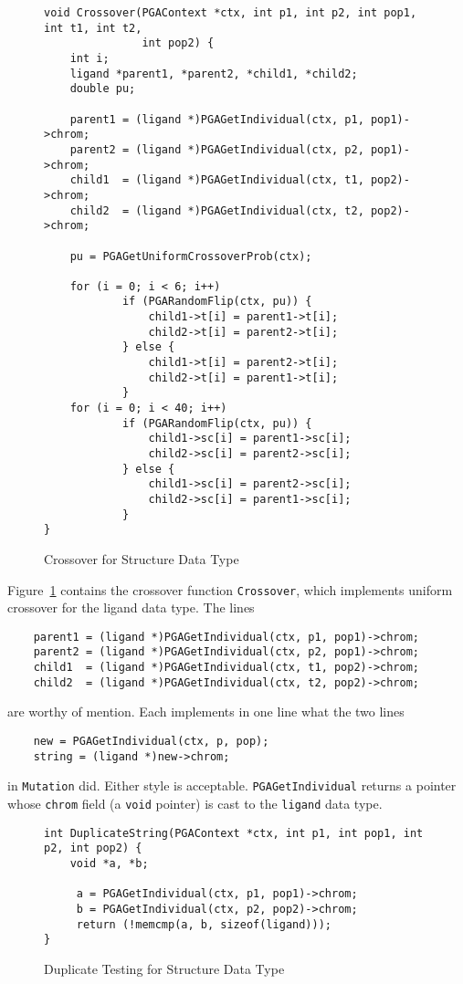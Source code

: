 \documentclass{report}
\begin{document}
\begin{figure}
\begin{verbatim}
void Crossover(PGAContext *ctx, int p1, int p2, int pop1, int t1, int t2,
               int pop2) {
    int i;
    ligand *parent1, *parent2, *child1, *child2;
    double pu;

    parent1 = (ligand *)PGAGetIndividual(ctx, p1, pop1)->chrom;
    parent2 = (ligand *)PGAGetIndividual(ctx, p2, pop1)->chrom;
    child1  = (ligand *)PGAGetIndividual(ctx, t1, pop2)->chrom;
    child2  = (ligand *)PGAGetIndividual(ctx, t2, pop2)->chrom;

    pu = PGAGetUniformCrossoverProb(ctx);

    for (i = 0; i < 6; i++)
            if (PGARandomFlip(ctx, pu)) {
                child1->t[i] = parent1->t[i];
                child2->t[i] = parent2->t[i];
            } else {
                child1->t[i] = parent2->t[i];
                child2->t[i] = parent1->t[i];
            }
    for (i = 0; i < 40; i++)
            if (PGARandomFlip(ctx, pu)) {
                child1->sc[i] = parent1->sc[i];
                child2->sc[i] = parent2->sc[i];
            } else {
                child1->sc[i] = parent2->sc[i];
                child2->sc[i] = parent1->sc[i];
            }
}
\end{verbatim}
\caption{Crossover for Structure Data Type}
\label{example1:new-datatype-crossover}
\end{figure}

Figure~\ref{example1:new-datatype-crossover} contains the crossover function
{\tt Crossover}, which implements uniform crossover for the ligand data type.
The lines
\begin{verbatim}
    parent1 = (ligand *)PGAGetIndividual(ctx, p1, pop1)->chrom;
    parent2 = (ligand *)PGAGetIndividual(ctx, p2, pop1)->chrom;
    child1  = (ligand *)PGAGetIndividual(ctx, t1, pop2)->chrom;
    child2  = (ligand *)PGAGetIndividual(ctx, t2, pop2)->chrom;
\end{verbatim}
are worthy of  mention.  Each implements in one line what the two lines 
\begin{verbatim}
    new = PGAGetIndividual(ctx, p, pop);
    string = (ligand *)new->chrom;
\end{verbatim}
in {\tt Mutation} did.  Either style is acceptable.  {\tt PGAGetIndividual}
returns a pointer whose {\tt chrom} field (a {\tt void} pointer) is cast to
the {\tt ligand} data type.

\begin{figure}
\begin{verbatim}
int DuplicateString(PGAContext *ctx, int p1, int pop1, int p2, int pop2) {
    void *a, *b;

     a = PGAGetIndividual(ctx, p1, pop1)->chrom;
     b = PGAGetIndividual(ctx, p2, pop2)->chrom;
     return (!memcmp(a, b, sizeof(ligand)));
}
\end{verbatim}
\caption{Duplicate Testing for Structure Data Type}
\label{example1:new-datatype-duplicate}
\end{figure}
\end{document}
